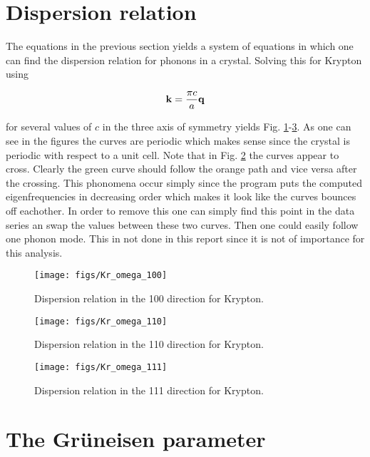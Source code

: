 \section{Dispersion relation}

The equations in the previous section yields a system of equations in which one can find the dispersion relation for phonons in a crystal. Solving this for Krypton using

\begin{equation*}
  \mathbf{k} = \frac{\pi c}{a}\mathbf{q}
\end{equation*}

for several values of $c$ in the three axis of symmetry yields Fig. \ref{fig:100}-\ref{fig:111}. As one can see in the figures the curves are periodic which makes sense since the crystal is periodic with respect to a unit cell. Note that in Fig. \ref{fig:110} the curves appear to cross. Clearly the green curve should follow the orange path and vice versa after the crossing. This phonomena occur simply since the program puts the computed eigenfrequencies in decreasing order which makes it look like the curves bounces off eachother. In order to remove this one can simply find this point in the data series an swap the values between these two curves. Then one could easily follow one phonon mode. This in not done in this report since it is not of importance for this analysis.


\begin{figure}[H]
  \centering
  \texttt{[image: figs/Kr\_omega\_100]}
  \caption{Dispersion relation in the 100 direction for Krypton.}
  \label{fig:100}
\end{figure}

\begin{figure}[H]
  \centering
  \texttt{[image: figs/Kr\_omega\_110]}
  \caption{Dispersion relation in the 110 direction for Krypton.}
  \label{fig:110}
\end{figure}

\begin{figure}[H]
  \centering
  \texttt{[image: figs/Kr\_omega\_111]}
  \caption{Dispersion relation in the 111 direction for Krypton.}
  \label{fig:111}
\end{figure}

\section{The Gr\"{u}neisen parameter}

